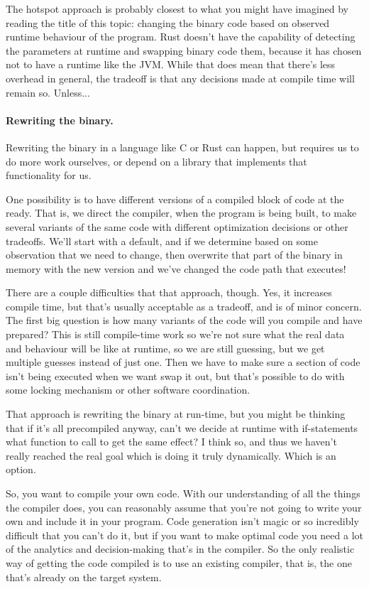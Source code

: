 \documentclass[a4paper]{report}
\begin{document}
The hotspot approach is probably closest to what you might have imagined by reading the title of this topic: changing the binary code based on observed runtime behaviour of the program. Rust doesn't have the capability of detecting the parameters at runtime and swapping binary code them, because it has chosen not to have a runtime like the JVM. While that does mean that there's less overhead in general, the tradeoff is that any decisions made at compile time will remain so. Unless...

\paragraph{Rewriting the binary.}
Rewriting the binary in a language like C or Rust can happen, but requires us to do more work ourselves, or depend on a library that implements that functionality for us.

One possibility is to have different versions of a compiled block of code at the ready. That is, we direct the compiler, when the program is being built, to make several variants of the same code with different optimization decisions or other tradeoffs. We'll start with a default, and if we determine based on some observation that we need to change, then overwrite that part of the binary in memory with the new version and we've changed the code path that executes!

There are a couple difficulties that that approach, though. Yes, it increases compile time, but that's usually acceptable as a tradeoff, and is of minor concern. The first big question is how many variants of the code will you compile and have prepared? This is still compile-time work so we're not sure what the real data and behaviour will be like at runtime, so we are still guessing, but we get multiple guesses instead of just one. Then we have to make sure a section of code isn't being executed when we want swap it out, but that's possible to do with some locking mechanism or other software coordination.

That approach is rewriting the binary at run-time, but you might be thinking that if it's all precompiled anyway, can't we decide at runtime with if-statements what function to call to get the same effect? I think so, and thus we haven't really reached the real goal which is doing it truly dynamically. Which is an option.

So, you want to compile your own code. With our understanding of all the things the compiler does, you can reasonably assume that you're not going to write your own and include it in your program. Code generation isn't magic or so incredibly difficult that you can't do it, but if you want to make optimal code you need a lot of the analytics and decision-making that's in the compiler. So the only realistic way of getting the code compiled is to use an existing compiler, that is, the one that's already on the target system.
\end{document}
